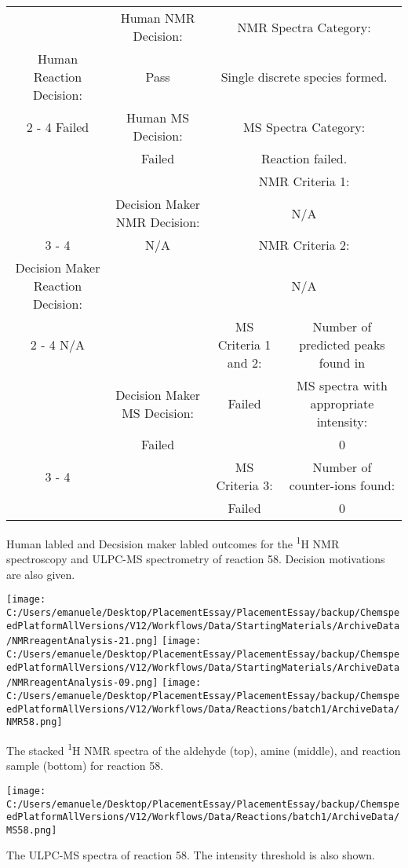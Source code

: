 \documentclass{article}%
\begin{document}
\begin{Decision Table}[H]%
\begin{tabular}{|c|c|c|c|}%
\hline%
&Human NMR Decision:&\multicolumn{2}{|c|}{NMR Spectra Category:}\\%
Human Reaction Decision:&Pass&\multicolumn{2}{|c|}{Single discrete species formed.}\\%
\cline{2%
-%
4}%
Failed&Human MS Decision:&\multicolumn{2}{|c|}{MS Spectra Category:}\\%
&Failed&\multicolumn{2}{|c|}{Reaction failed.}\\%
\hline%
&&\multicolumn{2}{|c|}{NMR Criteria 1:}\\%
&Decision Maker NMR Decision:&\multicolumn{2}{|c|}{N/A}\\%
\cline{3%
-%
4}%
&N/A&\multicolumn{2}{|c|}{NMR Criteria 2:}\\%
Decision Maker Reaction Decision:&&\multicolumn{2}{|c|}{N/A}\\%
\cline{2%
-%
4}%
N/A&&MS Criteria 1 and 2:&Number of predicted peaks found in\\%
&Decision Maker MS Decision:&Failed&MS spectra with appropriate intensity:\\%
&Failed&&0\\%
\cline{3%
-%
4}%
&&MS Criteria 3:&Number of counter{-}ions found:\\%
&&Failed&0\\%
\hline%
\end{tabular}%
\caption{Human labled and Decsision maker labled outcomes for the \textsuperscript{1}H NMR spectroscopy and ULPC-MS spectrometry of reaction 58. Decision motivations are also given.}%
\end{Decision Table}%
\begin{NMR Spectra}[H]%
\begin{center}%
\texttt{[image: C:/Users/emanuele/Desktop/PlacementEssay/PlacementEssay/backup/ChemspeedPlatformAllVersions/V12/Workflows/Data/StartingMaterials/ArchiveData/NMRreagentAnalysis-21.png]}\hfill%
\texttt{[image: C:/Users/emanuele/Desktop/PlacementEssay/PlacementEssay/backup/ChemspeedPlatformAllVersions/V12/Workflows/Data/StartingMaterials/ArchiveData/NMRreagentAnalysis-09.png]}\hfill%
\texttt{[image: C:/Users/emanuele/Desktop/PlacementEssay/PlacementEssay/backup/ChemspeedPlatformAllVersions/V12/Workflows/Data/Reactions/batch1/ArchiveData/NMR58.png]}\hfill%
\end{center}%
\caption{The stacked \textsuperscript{1}H NMR spectra of the aldehyde (top), amine (middle), and reaction sample (bottom) for reaction 58.}%
\end{NMR Spectra}%
\begin{MS Spectra}[H]%
\begin{center}%
\texttt{[image: C:/Users/emanuele/Desktop/PlacementEssay/PlacementEssay/backup/ChemspeedPlatformAllVersions/V12/Workflows/Data/Reactions/batch1/ArchiveData/MS58.png]}\hfill%
\end{center}%
\caption{The ULPC-MS spectra of reaction 58. The intensity threshold is also shown.}%
\end{MS Spectra}%
\end{document}
